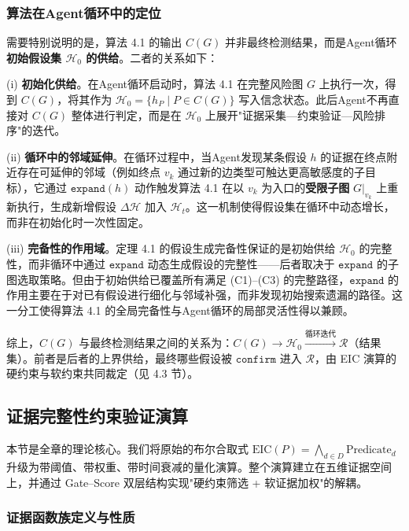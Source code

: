 \documentclass[a4paper,12pt]{ctexart}
\begin{document}
\subsubsection{算法在Agent循环中的定位}

需要特别说明的是，算法 4.1 的输出 $C(G)$ 并非最终检测结果，而是Agent循环\textbf{初始假设集 $\mathcal{H}_0$ 的供给}。二者的关系如下：

(i) \textbf{初始化供给}。在Agent循环启动时，算法 4.1 在完整风险图 $G$ 上执行一次，得到 $C(G)$，将其作为 $\mathcal{H}_0 = \{h_P \mid P \in C(G)\}$ 写入信念状态。此后Agent不再直接对 $C(G)$ 整体进行判定，而是在 $\mathcal{H}_0$ 上展开"证据采集—约束验证—风险排序"的迭代。

(ii) \textbf{循环中的邻域延伸}。在循环过程中，当Agent发现某条假设 $h$ 的证据在终点附近存在可延伸的邻域（例如终点 $v_k$ 通过新的边类型可触达更高敏感度的子目标），它通过 $\texttt{expand}(h)$ 动作触发算法 4.1 在以 $v_k$ 为入口的\textbf{受限子图} $G|_{v_k}$ 上重新执行，生成新增假设 $\Delta\mathcal{H}$ 加入 $\mathcal{H}_t$。这一机制使得假设集在循环中动态增长，而非在初始化时一次性固定。

(iii) \textbf{完备性的作用域}。定理 4.1 的假设生成完备性保证的是初始供给 $\mathcal{H}_0$ 的完整性，而非循环中通过 $\texttt{expand}$ 动态生成假设的完整性——后者取决于 $\texttt{expand}$ 的子图选取策略。但由于初始供给已覆盖所有满足 (C1)–(C3) 的完整路径，$\texttt{expand}$ 的作用主要在于对已有假设进行细化与邻域补强，而非发现初始搜索遗漏的路径。这一分工使得算法 4.1 的全局完备性与Agent循环的局部灵活性得以兼顾。

综上，$C(G)$ 与最终检测结果之间的关系为：$C(G) \to \mathcal{H}_0 \xrightarrow{\text{循环迭代}} \mathcal{R}$（结果集）。前者是后者的上界供给，最终哪些假设被 $\texttt{confirm}$ 进入 $\mathcal{R}$，由 EIC 演算的硬约束与软约束共同裁定（见 4.3 节）。

\subsection{证据完整性约束验证演算}

本节是全章的理论核心。我们将原始的布尔合取式 $\text{EIC}(P) = \bigwedge_{d \in D}\text{Predicate}_d$ 升级为带阈值、带权重、带时间衰减的量化演算。整个演算建立在五维证据空间上，并通过 Gate–Score 双层结构实现"硬约束筛选 + 软证据加权"的解耦。

\subsubsection{证据函数族定义与性质}
\end{document}
